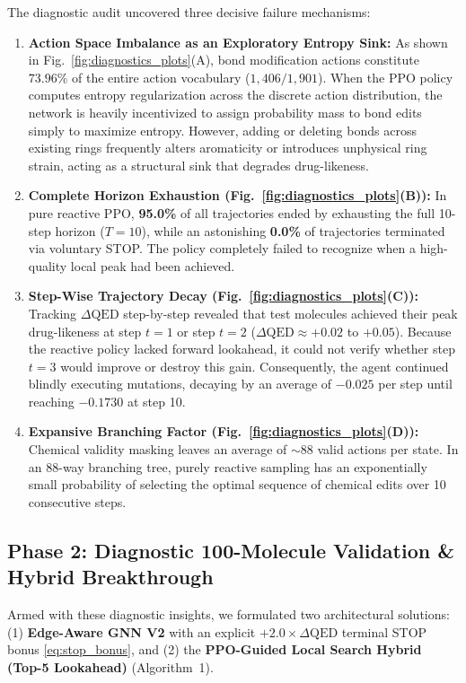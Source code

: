 \documentclass{ieeeaccess}
\begin{document}
The diagnostic audit uncovered three decisive failure mechanisms:
\begin{enumerate}
    \item \textbf{Action Space Imbalance as an Exploratory Entropy Sink:} As shown in Fig.~\ref{fig:diagnostics_plots}(A), bond modification actions constitute $73.96\%$ of the entire action vocabulary ($1,406 / 1,901$). When the PPO policy computes entropy regularization across the discrete action distribution, the network is heavily incentivized to assign probability mass to bond edits simply to maximize entropy. However, adding or deleting bonds across existing rings frequently alters aromaticity or introduces unphysical ring strain, acting as a structural sink that degrades drug-likeness.
    \item \textbf{Complete Horizon Exhaustion (Fig.~\ref{fig:diagnostics_plots}(B)):} In pure reactive PPO, \textbf{95.0\%} of all trajectories ended by exhausting the full 10-step horizon ($T=10$), while an astonishing \textbf{0.0\%} of trajectories terminated via voluntary STOP. The policy completely failed to recognize when a high-quality local peak had been achieved.
    \item \textbf{Step-Wise Trajectory Decay (Fig.~\ref{fig:diagnostics_plots}(C)):} Tracking $\Delta\text{QED}$ step-by-step revealed that test molecules achieved their peak drug-likeness at step $t=1$ or step $t=2$ ($\Delta\text{QED} \approx +0.02$ to $+0.05$). Because the reactive policy lacked forward lookahead, it could not verify whether step $t=3$ would improve or destroy this gain. Consequently, the agent continued blindly executing mutations, decaying by an average of $-0.025$ per step until reaching $-0.1730$ at step 10.
    \item \textbf{Expansive Branching Factor (Fig.~\ref{fig:diagnostics_plots}(D)):} Chemical validity masking leaves an average of $\sim88$ valid actions per state. In an 88-way branching tree, purely reactive sampling has an exponentially small probability of selecting the optimal sequence of chemical edits over 10 consecutive steps.
\end{enumerate}

\subsection{Phase 2: Diagnostic 100-Molecule Validation \& Hybrid Breakthrough}
Armed with these diagnostic insights, we formulated two architectural solutions: (1) \textbf{Edge-Aware GNN V2} with an explicit $+2.0\times\Delta\text{QED}$ terminal STOP bonus \eqref{eq:stop_bonus}, and (2) the \textbf{PPO-Guided Local Search Hybrid (Top-5 Lookahead)} (Algorithm~1).
\end{document}
